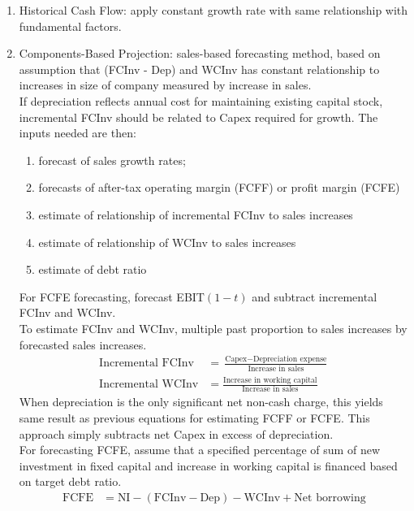 \begin{method} 
\begin{enumerate}[label=\roman*.]
\setlength{\itemsep}{0pt}
\item Historical Cash Flow: apply constant growth rate with same relationship with fundamental factors.
\item Components-Based Projection: sales-based forecasting method, based on assumption that (FCInv - Dep) and WCInv has constant relationship to increases in size of company measured by increase in sales.\\
If depreciation reflects annual cost for maintaining existing capital stock, incremental FCInv should be related to Capex required for growth. The inputs needed are then:
\begin{enumerate}[label=\arabic*.]
\setlength{\itemsep}{0pt}
\item forecast of sales growth rates;
\item forecasts of after-tax operating margin (FCFF) or profit margin (FCFE)
\item estimate of relationship of incremental FCInv to sales increases
\item estimate of relationship of WCInv to sales increases
\item estimate of debt ratio
\end{enumerate}
For FCFE forecasting, forecast EBIT$(1-t)$ and subtract incremental FCInv and WCInv.\\
To estimate FCInv and WCInv, multiple past proportion to sales increases by forecasted sales increases.
\begin{align}
\text{Incremental FCInv} &= \frac{\text{Capex} - \text{Depreciation expense}}{\text{Increase in sales}} \nonumber \\
\text{Incremental WCInv} &= \frac{\text{Increase in working capital}}{\text{Increase in sales}} \nonumber
\end{align}
When depreciation is the only significant net non-cash charge, this yields same result as previous equations for estimating FCFF or FCFE.  This approach simply subtracts net Capex in excess of depreciation.\\
For forecasting FCFE, assume that a specified percentage of sum of new investment in fixed capital and increase in working capital is financed based on target debt ratio.
\begin{align}
\text{FCFE} &= \text{NI} - (\text{FCInv} - \text{Dep}) - \text{WCInv} + \text{Net borrowing} \nonumber
\end{align}

\end{enumerate}
\end{method}
